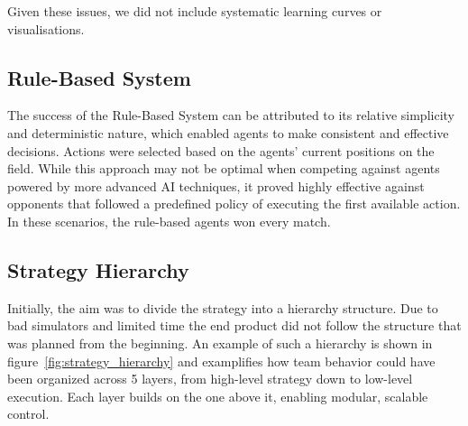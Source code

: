Given these issues, we did not include systematic learning curves or visualisations.

\subsection{Rule-Based System}
The success of the Rule-Based System can be attributed to its relative simplicity and deterministic nature, which enabled agents to make consistent and effective decisions. Actions were selected based on the agents' current positions on the field. While this approach may not be optimal when competing against agents powered by more advanced AI techniques, it proved highly effective against opponents that followed a predefined policy of executing the first available action. In these scenarios, the rule-based agents won every match.

\subsection{Strategy Hierarchy}
Initially, the aim was to divide the strategy into a hierarchy structure. Due to bad simulators and limited time the end product did not follow the structure that was planned from the beginning. An example of such a hierarchy is shown in figure~\ref{fig:strategy_hierarchy} and examplifies how team behavior could have been organized across 5 layers, from high-level strategy down to low-level execution. Each layer builds on the one above it, enabling modular, scalable control.  

